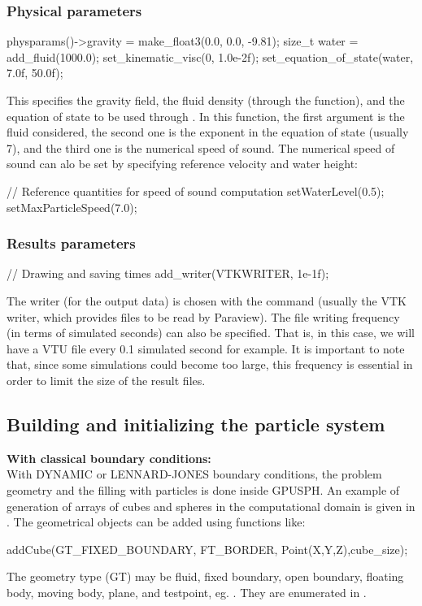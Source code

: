 \subsubsection{Physical parameters}
\begin{ccode}
physparams()->gravity = make_float3(0.0, 0.0, -9.81);
size_t water = add_fluid(1000.0);
set_kinematic_visc(0, 1.0e-2f);
set_equation_of_state(water, 7.0f, 50.0f);
\end{ccode} 
This specifies the gravity field, the fluid density 
(through the  function),
and the equation of state to be used through .
In this function, the first argument is the fluid considered,
the second one is the exponent in the equation of state (usually 7),
and the third one is the numerical speed of sound.
The numerical speed of sound can alo be set by specifying reference
velocity and water height:
\begin{ccode}
// Reference quantities for speed of sound computation
setWaterLevel(0.5);
setMaxParticleSpeed(7.0);
\end{ccode} 
   
\subsubsection{Results parameters}
\begin{ccode}
  // Drawing and saving times
  add_writer(VTKWRITER, 1e-1f);
\end{ccode} 
The writer (for the output data) is chosen with the 
command (usually the VTK writer, which provides files to be read by Paraview).  
The file writing frequency (in terms of simulated seconds) can also be specified. 
That is, in this case, we will have a VTU file every 0.1 simulated second for example. 
It is important to note that, since some simulations could become 
too large, this frequency is essential in order to limit the size of the result files.\\


\subsection{Building and initializing the particle system}

\textbf{With classical boundary conditions:}\\

With DYNAMIC or LENNARD-JONES boundary conditions, the
problem geometry and the filling with particles is done
inside GPUSPH. An example of generation of arrays
of cubes and spheres in the computational domain is given in
. 
The geometrical objects can be added using functions like:
\begin{ccode}
addCube(GT_FIXED_BOUNDARY, FT_BORDER,
             Point(X,Y,Z),cube_size);
\end{ccode}
The geometry type (GT) may be fluid, fixed boundary, open boundary, 
floating body, moving body, plane, and testpoint, eg. . 
They are enumerated in .\\


